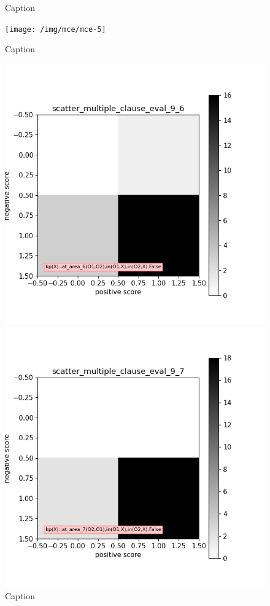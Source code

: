 \begin{figure}[H]
\begin{minipage}[b]{.3\textwidth}
        \caption{Caption}\label{label-e}
    \end{minipage}
    \begin{minipage}[b]{.3\textwidth}
        \texttt{[image: /img/mce/mce-5]}
        \caption{Caption}\label{label-f}
    \end{minipage}
    \begin{minipage}[b]{.3\textwidth}
        \includegraphics[width=\textwidth]{img/mce/mce-6}
        \caption{Caption}\label{label-g}
    \end{minipage}
    \begin{minipage}[b]{.3\textwidth}
        \includegraphics[width=\textwidth]{img/mce/mce-7}

\end{minipage}
\end{figure}
